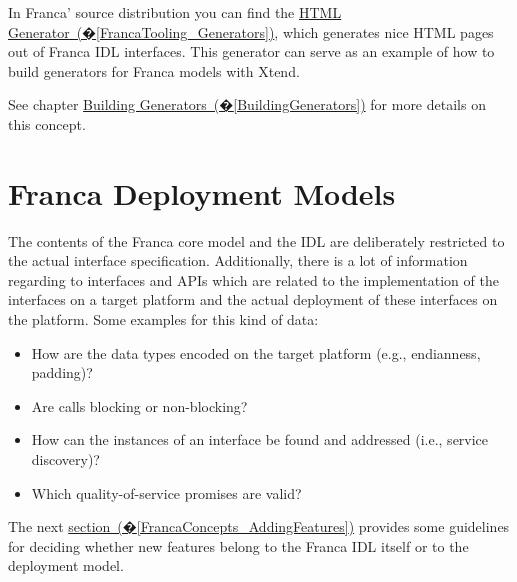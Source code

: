 \documentclass[a4paper,10pt]{scrreprt}
\newlength{\XdocItemIndent}
\begin{document}
In Franca' source distribution you can find the
\hyperref[FrancaTooling_Generators]{HTML Generator~(�\ref*{FrancaTooling_Generators})}, which generates nice HTML pages
out of Franca IDL interfaces. This generator can serve as an example of how
to build generators for Franca models with Xtend. 

See chapter \hyperref[BuildingGenerators]{Building Generators~(�\ref*{BuildingGenerators})} for more details 
on this concept. 

\section{Franca Deployment Models}
\label{FrancaConcepts_DeploymentModels}
The contents of the Franca core model and the IDL are deliberately restricted to
the actual interface specification. Additionally, there is a lot of information
regarding to interfaces and APIs which are related to the implementation
of the interfaces on a target platform and the actual deployment of these
interfaces on the platform. Some examples for this kind of data:
\setlength{\XdocItemIndent}{\textwidth}
\begin{itemize}
\addtolength{\XdocItemIndent}{-2.5em}
\item \begin{minipage}[t]{\XdocItemIndent}
How are the data types encoded on the target platform (e.g., endianness, padding)?

\end{minipage}
\item \begin{minipage}[t]{\XdocItemIndent}
Are calls blocking or non-blocking?

\end{minipage}
\item \begin{minipage}[t]{\XdocItemIndent}
How can the instances of an interface be found and addressed (i.e., service discovery)?

\end{minipage}
\item \begin{minipage}[t]{\XdocItemIndent}
Which quality-of-service promises are valid?

\end{minipage}
\end{itemize}
\addtolength{\XdocItemIndent}{2.5em}

The next \hyperref[FrancaConcepts_AddingFeatures]{section~(�\ref*{FrancaConcepts_AddingFeatures})} provides some guidelines
for deciding whether new features belong to the Franca IDL itself or to the deployment model.
\end{document}
